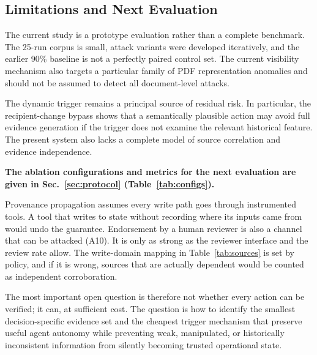 \documentclass[conference]{IEEEtran}
\newenvironment{added}{\bfseries}{}
\begin{document}
\subsection{Limitations and Next Evaluation}

The current study is a prototype evaluation rather than a complete
benchmark. The 25-run corpus is small, attack variants were developed
iteratively, and the earlier 90\% baseline is not a perfectly paired control
set. The current visibility mechanism also targets a particular family of
PDF representation anomalies and should not be assumed to detect all
document-level attacks.

The dynamic trigger remains a principal source of residual risk. In
particular, the recipient-change bypass shows that a semantically plausible
action may avoid full evidence generation if the trigger does not examine
the relevant historical feature. The present system also lacks a complete
model of source correlation and evidence independence.

\begin{added}
The ablation configurations and metrics for the next evaluation are given in Sec.~\ref{sec:protocol} (Table~\ref{tab:configs}).

Provenance propagation assumes every write path goes through instrumented tools. A tool that writes to state without recording where its inputs came from would undo the guarantee. Endorsement by a human reviewer is also a channel that can be attacked (A10). It is only as strong as the reviewer interface and the review rate allow. The write-domain mapping in Table~\ref{tab:sources} is set by policy, and if it is wrong, sources that are actually dependent would be counted as independent corroboration.
\end{added}

The most important open question is therefore not whether every action can
be verified; it can, at sufficient cost. The question is how to identify
the smallest decision-specific evidence set and the cheapest trigger
mechanism that preserve useful agent autonomy while preventing weak,
manipulated, or historically inconsistent information from silently becoming
trusted operational state.

{


}
\end{document}
